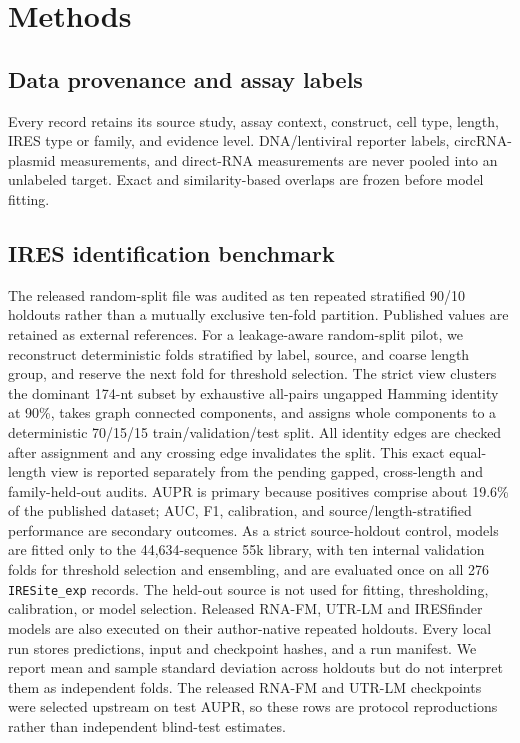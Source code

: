 \section{Methods}

\subsection{Data provenance and assay labels}
Every record retains its source study, assay context, construct, cell type, length, IRES type or
family, and evidence level. DNA/lentiviral reporter labels, circRNA-plasmid measurements, and
direct-RNA measurements are never pooled into an unlabeled target. Exact and similarity-based
overlaps are frozen before model fitting.

\subsection{IRES identification benchmark}
The released random-split file was audited as ten repeated stratified 90/10 holdouts rather than a
mutually exclusive ten-fold partition. Published values are retained as external references. For a
leakage-aware random-split pilot, we reconstruct deterministic folds stratified by label, source,
and coarse length group, and reserve the next fold for threshold selection. The strict view clusters
the dominant 174-nt subset by exhaustive all-pairs ungapped Hamming identity at 90\%, takes graph
connected components, and assigns whole components to a deterministic 70/15/15
train/validation/test split. All identity edges are checked after assignment and any crossing edge
invalidates the split. This exact equal-length view is reported separately from the pending gapped,
cross-length and family-held-out audits. AUPR is primary
because positives comprise about 19.6\% of the published dataset; AUC, F1, calibration, and
source/length-stratified performance are secondary outcomes. As a strict source-holdout control,
models are fitted only to the 44,634-sequence 55k library, with ten internal validation folds for
threshold selection and ensembling, and are evaluated once on all 276 \texttt{IRESite\_exp} records.
The held-out source is not used for fitting, thresholding, calibration, or model selection.
Released RNA-FM, UTR-LM and IRESfinder models are also executed on their author-native repeated
holdouts. Every local run stores predictions, input and checkpoint hashes, and a run manifest. We
report mean and sample standard deviation across holdouts but do not interpret them as independent
folds. The released RNA-FM and UTR-LM checkpoints were selected upstream on test AUPR, so these
rows are protocol reproductions rather than independent blind-test estimates.

